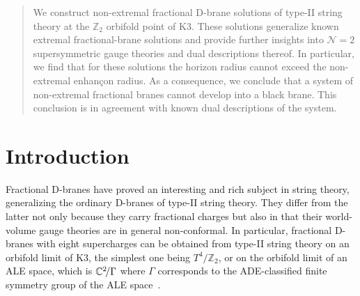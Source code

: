 \documentclass[a4paper,11pt]{article}
\newcommand{\ZZ}{\mathbb{Z}}  \newcommand{\Zint}{\mathbb{Z}}
\begin{document}
\begin{titlepage}
\vspace{1ex}

\begin{abstract}
We construct non-extremal fractional D-brane solutions of type-II
string theory at the $\ZZ_2$ orbifold point of K3. These solutions
generalize known extremal fractional-brane solutions and provide
further insights into $\mathcal{N}=2$ supersymmetric gauge theories
and dual descriptions thereof. In particular, we find that for these
solutions the horizon radius cannot exceed the non-extremal
enhan\c{c}on radius. As a consequence, we conclude that a system of
non-extremal fractional branes cannot develop into a black brane. This
conclusion is in agreement with known dual descriptions of the system.
\end{abstract}

\vspace*{3ex}

\end{titlepage}

\renewcommand{\thefootnote}{\arabic{footnote}}
\setcounter{footnote}{0} \setcounter{page}{2} \setcounter{tocdepth}{2}



\tableofcontents


\vspace{1ex}
\section{Introduction}

Fractional D-branes
\cite{Douglas:1997xg,Douglas:1997de,Polchinski:1997ry} have proved an
interesting and rich subject in string theory, generalizing the ordinary
D-branes of type-II string theory. They differ from the latter not only
because they carry fractional charges but also in that their world-volume
gauge theories are in general non-conformal. In particular, fractional
D-branes with eight supercharges can be obtained from type-II string
theory on an orbifold limit of K3, the simplest one being $T^4\!/\ZZ_2$,
or on the orbifold limit of an ALE space, which is $\mathbb{C}^2\!/\Gamma$ where
$\Gamma$ corresponds to the ADE-classified finite symmetry group of the
ALE space~\cite{Douglas:1996sw,Johnson:1997py}.
\end{document}
